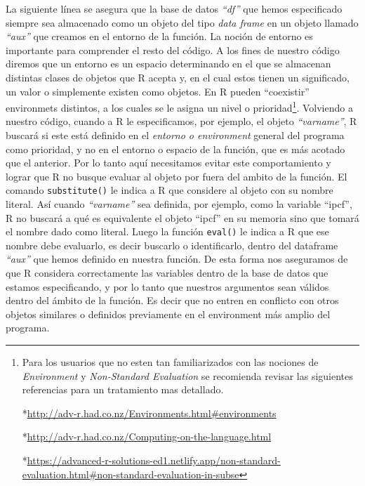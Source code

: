 \documentclass[
]{book}
\begin{document}
La siguiente línea se asegura que la base de datos \emph{``df''} que hemos especificado siempre sea almacenado como un objeto del tipo \emph{data frame} en un objeto llamado \emph{``aux''} que creamos en el entorno de la función. La noción de entorno es importante para comprender el resto del código. A los fines de nuestro código diremos que un entorno es un espacio determinando en el que se almacenan distintas clases de objetos que R acepta y, en el cual estos tienen un significado, un valor o simplemente existen como objetos. En R pueden ``coexistir'' environmets distintos, a los cuales se le asigna un nivel o prioridad\footnote{Para los usuarios que no esten tan familiarizados con las nociones de \emph{Environment} y \emph{Non-Standard Evaluation} se recomienda revisar las siguientes referencias para un tratamiento mas detallado.

  *\url{http://adv-r.had.co.nz/Environments.html\#environments}

  *\url{http://adv-r.had.co.nz/Computing-on-the-language.html}

  *\url{https://advanced-r-solutions-ed1.netlify.app/non-standard-evaluation.html\#non-standard-evaluation-in-subse}}. Volviendo a nuestro código, cuando a R le especificamos, por ejemplo, el objeto \emph{``varname''}, R buscará si este está definido en el \emph{entorno o environment} general del programa como prioridad, y no en el entorno o espacio de la función, que es más acotado que el anterior. Por lo tanto aquí necesitamos evitar este comportamiento y lograr que R no busque evaluar al objeto por fuera del ambito de la función. El comando \texttt{substitute()} le indica a R que considere al objeto con su nombre literal. Así cuando \emph{``varname''} sea definida, por ejemplo, como la variable ``ipcf'', R no buscará a qué es equivalente el objeto ``ipcf'' en su memoria sino que tomará el nombre dado como literal. Luego la función \texttt{eval()} le indica a R que ese nombre debe evaluarlo, es decir buscarlo o identificarlo, dentro del dataframe \emph{``aux''} que hemos definido en nuestra función. De esta forma nos aseguramos de que R considera correctamente las variables dentro de la base de datos que estamos especificando, y por lo tanto que nuestros argumentos sean válidos dentro del ámbito de la función. Es decir que no entren en conflicto con otros objetos similares o definidos previamente en el environment más amplio del programa.
\end{document}
